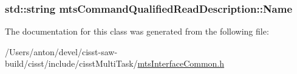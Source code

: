 \subsubsection[{Name}]{\setlength{\rightskip}{0pt plus 5cm}std\+::string mts\+Command\+Qualified\+Read\+Description\+::\+Name}\label{classmts_command_qualified_read_description_a9baf176ea04ec6aef288cffbe6fe2c2e}


The documentation for this class was generated from the following file\+:\begin{DoxyCompactItemize}
\item 
/\+Users/anton/devel/cisst-\/saw-\/build/cisst/include/cisst\+Multi\+Task/\hyperlink{mts_interface_common_8h}{mts\+Interface\+Common.\+h}\end{DoxyCompactItemize}

